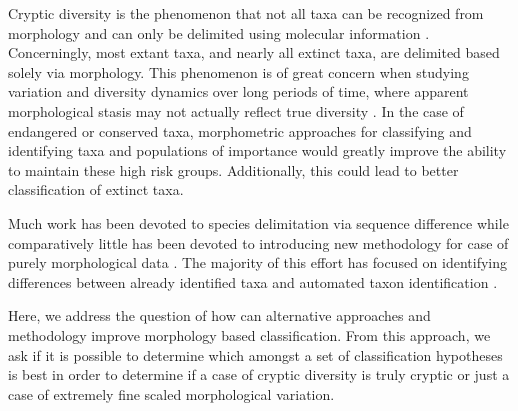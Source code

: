 \documentclass[12pt,letterpaper]{article}\usepackage{graphicx, color}
\renewcommand{\section}[1]{%
\bigskip
\begin{center}
\begin{Large}
\normalfont\scshape #1
\medskip
\end{Large}
\end{center}}
\begin{document}

Cryptic diversity is the phenomenon that not all taxa can be recognized from morphology and can only be delimited using molecular information \citep{Stuart2006,Pfenninger2007,Funk2012,Clare2011}. Concerningly, most extant taxa, and nearly all extinct taxa, are delimited based solely via morphology. This phenomenon is of great concern when studying variation and diversity dynamics over long periods of time, where apparent morphological stasis may not actually reflect true diversity \citep{Hunt2008,Eldredge1972,Gould1977a,VanBocxlaer2013}. In the case of endangered or conserved taxa, morphometric approaches for classifying and identifying taxa and populations of importance would greatly improve the ability to maintain these high risk groups. Additionally, this could lead to better classification of extinct taxa.

Much work has been devoted to species delimitation via sequence difference \citep{Fujita2012,Yang2010b} while comparatively little has been devoted to introducing new methodology for case of purely morphological data \citep{Mitteroecker2011,Zelditch2004}. The majority of this effort has focused on identifying differences between already identified taxa \citep{Polly2007a,Demandt2009,Gaubert2005b,Gunduz2007,Polly2003,Zelditch2004} and automated taxon identification \citep{MacLeod2007}.

Here, we address the question of how can alternative approaches and methodology improve morphology based classification. From this approach, we ask if it is possible to determine which amongst a set of classification hypotheses is best in order to determine if a case of cryptic diversity is truly cryptic or just a case of extremely fine scaled morphological variation.

\end{document}
